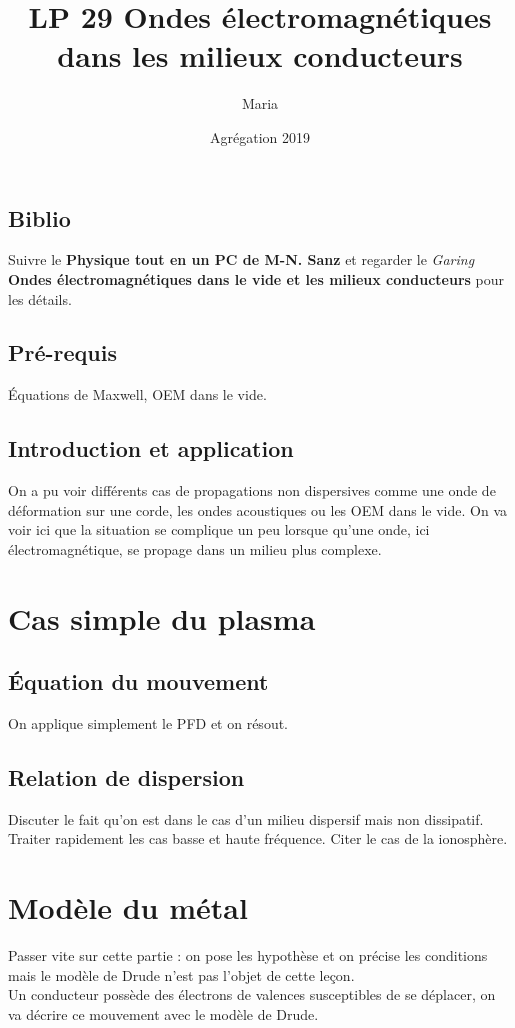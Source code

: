 \documentclass[12pt,prb,aps,epsf]{article}
\begin{document}
	
	\title{LP 29 Ondes électromagnétiques dans les milieux conducteurs}
	\author{Maria}
	\date{Agrégation 2019}
	
	\maketitle
	
	\tableofcontents
	
	\pagebreak
	
	
	
\subsection{Biblio}
Suivre le \textbf{Physique tout en un PC de M-N. Sanz} et regarder le \textit{Garing} \textbf{Ondes électromagnétiques dans le vide et les milieux conducteurs} pour les détails.

\subsection{Pré-requis}
Équations de Maxwell, OEM dans le vide.
	
\subsection{Introduction et application}
On a pu voir différents cas de propagations non dispersives comme une onde de déformation sur une corde, les ondes acoustiques ou les OEM dans le vide. On va voir ici que la situation se complique un peu lorsque qu'une onde, ici électromagnétique, se propage dans un milieu plus complexe.

\section{Cas simple du plasma}
\subsection{Équation du mouvement}
On applique simplement le PFD et on résout.
\subsection{Relation de dispersion}
Discuter le fait qu'on est dans le cas d'un milieu dispersif mais non dissipatif. Traiter rapidement les cas basse et haute fréquence. Citer le cas de la ionosphère.

\section{Modèle du métal}
Passer vite sur cette partie : on pose les hypothèse et on précise les conditions mais le modèle de Drude n'est pas l'objet de cette leçon.\\
Un conducteur possède des électrons de valences susceptibles de se déplacer, on va décrire ce mouvement avec le modèle de Drude.
\end{document}
